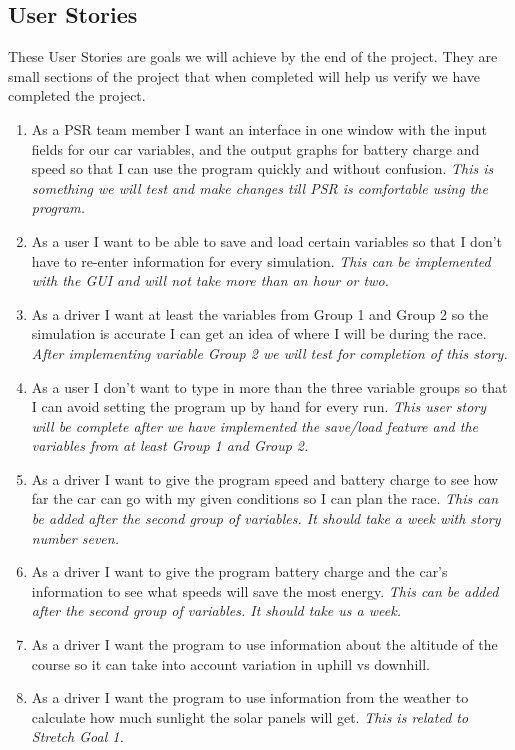 \documentclass[onecolumn, draftclsnofoot,10pt, compsoc]{IEEEtran}
\begin{document}
\begin{singlespace}
    \subsection{User Stories}
    These User Stories are goals we will achieve by the end of the project. They are small sections of the project that when completed will help us verify we have completed the project.
    \begin{enumerate}
        \item As a PSR team member I want an interface in one window with the input fields for our car variables, and the output graphs for battery charge and speed so that I can use the program quickly and without confusion. \textit{This is something we will test and make changes till PSR is comfortable using the program.}
        \item As a user I want to be able to save and load certain variables so that I don't have to re-enter information for every simulation. \textit{This can be implemented with the GUI and will not take more than an hour or two.}
        \item As a driver I want at least the variables from Group 1 and Group 2 so the simulation is accurate I can get an idea of where I will be during the race. \textit{After implementing variable Group 2 we will test for completion of this story.}
        \item As a user I don't want to type in  more than the three variable groups so that I can avoid setting the program up by hand for every run. \textit{This user story will be complete after we have implemented the save/load feature and the variables from at least Group 1 and Group 2.}
        \item As a driver I want to give the program speed and battery charge to see how far the car can go with my given conditions so I can plan the race. \textit{This can be added after the second group of variables. It should take a week with story number seven.}
        \item As a driver I want to give the program battery charge and the car's information to see what speeds will save the most energy. \textit{This can be added after the second group of variables. It should take us a week.}
        \item As a driver I want the program to use information about the altitude of the course so it can take into account variation in uphill vs downhill.
        \item As a driver I want the program to use information from the weather to calculate how much sunlight the solar panels will get. \textit{This is related to Stretch Goal 1.}
    \end{enumerate}
    

\end{singlespace}
\end{document}
